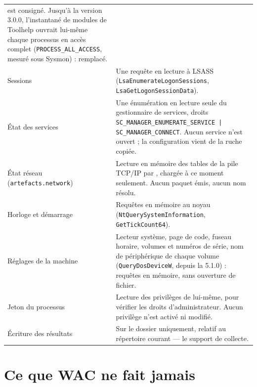 \documentclass[11pt,a4paper,oneside]{report}
\begin{document}
\begin{longtable}{@{}L{4.3cm}L{10.1cm}@{}}
  est consigné. Jusqu'à la version 3.0.0, l'instantané de modules de Toolhelp
  ouvrait lui-même chaque processus en accès complet
  (\texttt{PROCESS\_ALL\_ACCESS}, mesuré sous Sysmon) : remplacé. \\
Sessions & Une requête en lecture à LSASS
  (\texttt{LsaEnumerateLogonSessions}, \texttt{LsaGetLogonSessionData}). \\
État des services & Une énumération en lecture seule du gestionnaire de
  services, droits \texttt{SC\_MANAGER\_ENUMERATE\_SERVICE |
  SC\_MANAGER\_CONNECT}. Aucun service n'est ouvert ; la configuration vient
  de la ruche copiée. \\
État réseau (\texttt{artefacts.network}) & Lecture en mémoire des tables de la
  pile TCP/IP par , chargée à ce moment seulement. Aucun
  paquet émis, aucun nom résolu. \\
Horloge et démarrage & Requêtes en mémoire au noyau
  (\texttt{NtQuerySystemInformation}, \texttt{GetTickCount64}). \\
Réglages de la machine & Lecteur système, page de code, fuseau horaire, volumes
  et numéros de série, nom de périphérique de chaque volume
  (\texttt{QueryDosDeviceW}, depuis la 5.1.0) : requêtes en mémoire, sans
  ouverture de fichier. \\
Jeton du processus & Lecture des privilèges de \wac{} lui-même, pour vérifier
  les droits d'administrateur. Aucun privilège n'est activé ni modifié. \\
Écriture des résultats & Sur le dossier  uniquement, relatif au
  répertoire courant — le support de collecte. \\
\bottomrule
\end{longtable}


\section{Ce que WAC ne fait jamais}
\end{document}

